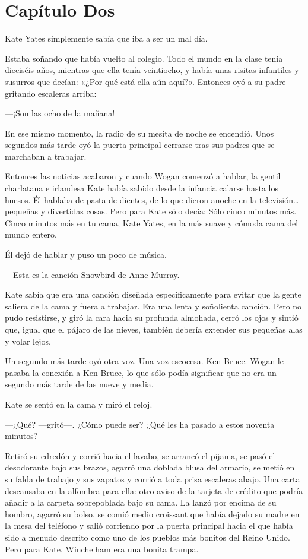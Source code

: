 \chapter*{Capítulo Dos}

Kate Yates simplemente sabía que iba a ser un mal día.

Estaba soñando que había vuelto al colegio. Todo el mundo en la clase
tenía dieciséis años, mientras que ella tenía veintiocho, y había unas
risitas infantiles y susurros que decían: «¿Por qué está ella aún
aquí?». Entonces oyó a su padre gritando escaleras arriba:

---¡Son las ocho de la mañana!

En ese mismo momento, la radio de su mesita de noche se encendió. Unos
segundos más tarde oyó la puerta principal cerrarse tras sus padres que
se marchaban a trabajar.

Entonces las noticias acabaron y cuando Wogan comenzó a hablar, la
gentil charlatana e irlandesa Kate había sabido desde la infancia
calarse hasta los huesos. Él hablaba de pasta de dientes, de lo que
dieron anoche en la televisión\ldots{} pequeñas y divertidas cosas. Pero
para Kate sólo decía: Sólo cinco minutos más. Cinco minutos más en tu
cama, Kate Yates, en la más suave y cómoda cama del mundo entero.

Él dejó de hablar y puso un poco de música.

---Esta es la canción Snowbird de Anne Murray.

Kate sabía que era una canción diseñada específicamente para evitar que
la gente saliera de la cama y fuera a trabajar. Era una lenta y
soñolienta canción. Pero no pudo resistirse, y giró la cara hacia su
profunda almohada, cerró los ojos y sintió que, igual que el pájaro de
las nieves, también debería extender sus pequeñas alas y volar lejos.

Un segundo más tarde oyó otra voz. Una voz escocesa. Ken Bruce. Wogan le
pasaba la conexión a Ken Bruce, lo que sólo podía significar que no era
un segundo más tarde de las nueve y media.

Kate se sentó en la cama y miró el reloj.

---¿Qué? ---gritó---. ¿Cómo puede ser? ¿Qué les ha pasado a estos noventa
minutos?

Retiró su edredón y corrió hacia el lavabo, se arrancó el pijama, se
pasó el desodorante bajo sus brazos, agarró una doblada blusa del
armario, se metió en su falda de trabajo y sus zapatos y corrió a toda
prisa escaleras abajo. Una carta descansaba en la alfombra para ella:
otro aviso de la tarjeta de crédito que podría añadir a la carpeta
sobrepoblada bajo su cama. La lanzó por encima de su hombro, agarró su
bolso, se comió medio croissant que había dejado su madre en la mesa del
teléfono y salió corriendo por la puerta principal hacia el que había
sido a menudo descrito como uno de los pueblos más bonitos del Reino
Unido. Pero para Kate, Winchelham era una bonita trampa.

